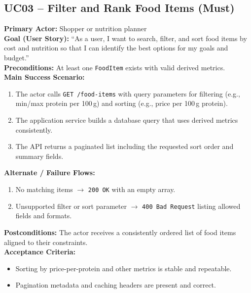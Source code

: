 \documentclass[11pt]{article}
\begin{document}
\subsection*{UC03 -- Filter and Rank Food Items (Must)}
\textbf{Primary Actor:} Shopper or nutrition planner\\
\textbf{Goal (User Story):} ``As a user, I want to search, filter, and sort food items by cost and nutrition so that I can identify the best options for my goals and budget.''\\
\textbf{Preconditions:} At least one \texttt{FoodItem} exists with valid derived metrics.\\
\textbf{Main Success Scenario:}
\begin{enumerate}[label=\arabic*.]
  \item The actor calls \texttt{GET /food-items} with query parameters for filtering (e.g., min/max protein per 100\,g) and sorting (e.g., price per 100\,g protein).
  \item The application service builds a database query that uses derived metrics consistently.
  \item The API returns a paginated list including the requested sort order and summary fields.
\end{enumerate}
\textbf{Alternate / Failure Flows:}
\begin{enumerate}[label=\arabic*F.]
  \item No matching items $\rightarrow$ \texttt{200 OK} with an empty array.
  \item Unsupported filter or sort parameter $\rightarrow$ \texttt{400 Bad Request} listing allowed fields and formats.
\end{enumerate}
\textbf{Postconditions:} The actor receives a consistently ordered list of food items aligned to their constraints.\\
\textbf{Acceptance Criteria:}
\begin{itemize}[noitemsep]
  \item Sorting by price-per-protein and other metrics is stable and repeatable.
  \item Pagination metadata and caching headers are present and correct.
\end{itemize}
\end{document}
